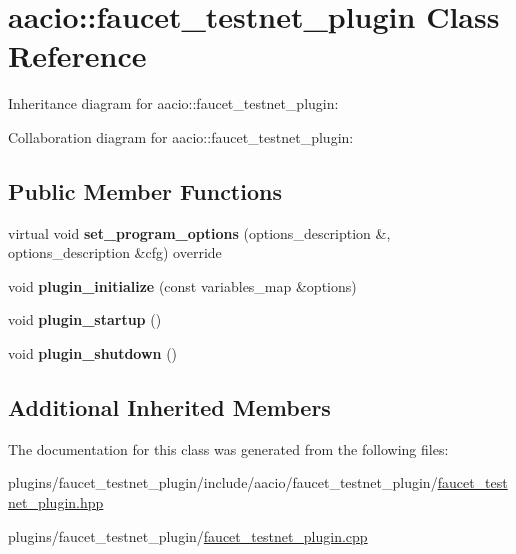\hypertarget{classaacio_1_1faucet__testnet__plugin}{}\section{aacio\+:\+:faucet\+\_\+testnet\+\_\+plugin Class Reference}
\label{classaacio_1_1faucet__testnet__plugin}


Inheritance diagram for aacio\+:\+:faucet\+\_\+testnet\+\_\+plugin\+:


Collaboration diagram for aacio\+:\+:faucet\+\_\+testnet\+\_\+plugin\+:
\subsection*{Public Member Functions}
\begin{DoxyCompactItemize}
\item 
\mbox{\label{classaacio_1_1faucet__testnet__plugin_ac774c8dffcad19b52cf01f6d313e8f89}} 
virtual void {\bfseries set\+\_\+program\+\_\+options} (options\+\_\+description \&, options\+\_\+description \&cfg) override
\item 
\mbox{\label{classaacio_1_1faucet__testnet__plugin_a6cbc7cc091ea8fa670792666ed5f2ef6}} 
void {\bfseries plugin\+\_\+initialize} (const variables\+\_\+map \&options)
\item 
\mbox{\label{classaacio_1_1faucet__testnet__plugin_ac4a5a5d76b414af40b689b14be7e51ef}} 
void {\bfseries plugin\+\_\+startup} ()
\item 
\mbox{\label{classaacio_1_1faucet__testnet__plugin_a2d25a93ec938abd10b2b0f33ea7fce64}} 
void {\bfseries plugin\+\_\+shutdown} ()
\end{DoxyCompactItemize}
\subsection*{Additional Inherited Members}


The documentation for this class was generated from the following files\+:\begin{DoxyCompactItemize}
\item 
plugins/faucet\+\_\+testnet\+\_\+plugin/include/aacio/faucet\+\_\+testnet\+\_\+plugin/\mbox{\hyperlink{faucet__testnet__plugin_8hpp}{faucet\+\_\+testnet\+\_\+plugin.\+hpp}}\item 
plugins/faucet\+\_\+testnet\+\_\+plugin/\mbox{\hyperlink{faucet__testnet__plugin_8cpp}{faucet\+\_\+testnet\+\_\+plugin.\+cpp}}\end{DoxyCompactItemize}

